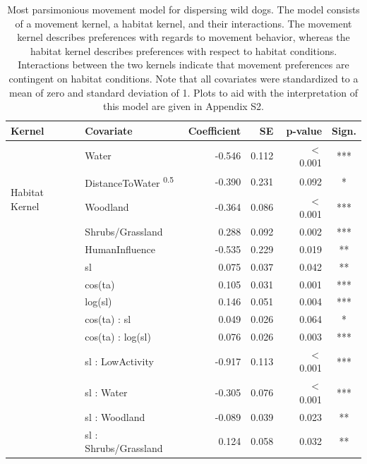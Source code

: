 \documentclass[abstract=on,10pt,a4paper,bibliography=totocnumbered]{article}
\begin{document}
\begin{table}
  \begin{center}
  \caption{Most parsimonious movement model for dispersing wild dogs. The model
  consists of a movement kernel, a habitat kernel, and their interactions. The
  movement kernel describes preferences with regards to movement behavior,
  whereas the habitat kernel describes preferences with respect to habitat
  conditions. Interactions between the two kernels indicate that movement
  preferences are contingent on habitat conditions. Note that all covariates
  were standardized to a mean of zero and standard deviation of 1. Plots to aid
  with the interpretation of this model are given in Appendix S2.}
  \label{MovementModelNumbers}
  \resizebox{\textwidth}{!} {
    \begin{threeparttable}
      \begin{tabular}{llrrrc}
        \toprule
        Kernel & Covariate & Coefficient & SE & p-value & Sign. \\
        \midrule
        \multirow{5}{*}{Habitat Kernel}
         & Water & -0.546 & 0.112 & \(<\) 0.001 & *** \\
         & DistanceToWater \textsuperscript{0.5} & -0.390 & 0.231 & 0.092 & * \\
         & Woodland & -0.364 & 0.086 & \(<\) 0.001 & *** \\
         & Shrubs/Grassland & 0.288 & 0.092 & 0.002 & *** \\
         & HumanInfluence & -0.535 & 0.229 & 0.019 & ** \\
        \hdashline
        \multirow{6}{*}{Movement Kernel}
         & sl & 0.075 & 0.037 & 0.042 & ** \\
         & cos(ta) & 0.105 & 0.031 & 0.001 & *** \\
         & log(sl) & 0.146 & 0.051 & 0.004 & *** \\
         & cos(ta) : sl & 0.049 & 0.026 & 0.064 & * \\
         & cos(ta) : log(sl) & 0.076 & 0.026 & 0.003 & *** \\
         & sl : LowActivity & -0.917 & 0.113 & \(<\) 0.001 & *** \\
        \hdashline
        \multirow{5}{*}{Interaction}
         & sl : Water & -0.305 & 0.076 & \(<\) 0.001 & *** \\
         & sl : Woodland & -0.089 & 0.039 & 0.023 & ** \\
         & sl : Shrubs/Grassland & 0.124 & 0.058 & 0.032 & ** \\

\end{tabular}
\end{threeparttable}}
\end{center}
\end{table}
\end{document}
